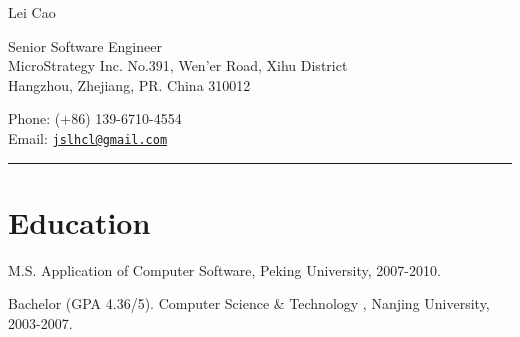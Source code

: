 \documentclass[letterpaper]{article}
\def\name{Lei Cao}
\renewenvironment{itemize}{
  \begin{list}{}{
    \setlength{\leftmargin}{1.5em}
    \setlength{\itemsep}{0pt}
  }
}{
  \end{list}
}
\begin{document}
{\huge \name}


\vspace{0.2in}
\begin{minipage}{0.55\linewidth}
  Senior Software Engineer \\
  MicroStrategy Inc.
  No.391, Wen'er Road, Xihu District\\
  Hangzhou, Zhejiang, PR. China 310012
\end{minipage}
\vspace{0.2in}
\begin{minipage}{0.40\linewidth}
  Phone: ($+$86) 139-6710-4554 \\
  Email: \href{mailto:jslhcl@gmail.com}{\tt jslhcl@gmail.com} \\
\end{minipage}

\rule{16.8cm}{0.1em}


\vspace{-1.5em}
\section*{Education}
\begin{itemize}
  \item M.S. Application of Computer Software, Peking University, 2007-2010.
  \item Bachelor (GPA 4.36/5). Computer Science \& Technology , Nanjing University, 2003-2007.
\end{itemize}

\end{document}
